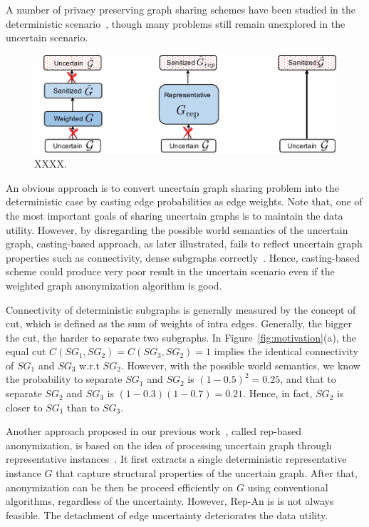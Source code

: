 A number of privacy preserving graph sharing schemes have been studied in the deterministic scenario~\cite{Liu_Towards_2008,Ying_Randomizing_2008,Wang2011,Liu_Privacy_2009,Nguyen_Anonymizing_2015,Sala_Sharing_2011,Xiao_Differentially_2014,lee2011}, though many problems still remain unexplored in the uncertain scenario.

\begin{figure}[!htb]
  \centering
  \includegraphics[width=0.9\linewidth]{ill/methods.pdf}
  \caption{XXXX.}
  \vspace{-14pt}
\end{figure}
An obvious approach is to convert uncertain graph sharing problem into the deterministic case by casting edge probabilities as edge weights. 
Note that, one of the most important goals of sharing uncertain graphs is to maintain the data utility. 
However, by disregarding the possible world semantics of the uncertain graph, casting-based approach, as later illustrated, fails to reflect uncertain graph properties such as connectivity, dense subgraphs correctly~\cite{Zhao_Detecting_2014,Hua_Probabilistic_2010}. 
Hence, casting-based scheme could produce very poor result in the uncertain scenario even if the weighted graph anonymization algorithm is good. 

{\small Connectivity of deterministic subgraphs is generally measured by the concept of cut, which is defined as the sum of weights of intra edges. Generally, the bigger the cut, the harder to separate two subgraphs. In Figure~\ref{fig:motivation}(a), the equal cut $C(SG_{1},SG_{2})=C(SG_{3},SG_{2})=1$ implies the identical connectivity of $SG_{1}$ and $SG_{3}$ w.r.t $SG_{2}$. However, with the possible world semantics, we know the probability to separate $SG_{1}$ and $SG_{2}$ is $(1-0.5)^{2}=0.25$, and that to separate $SG_{2}$ and $SG_{3}$ is $(1-0.3)(1-0.7)=0.21$. Hence, in fact, $SG_{2}$ is closer to $SG_{1}$ than to $SG_{3}$.} 

Another approach proposed in our previous work~\cite{Xiao:2018}, called rep-based anonymization, is based on the idea of processing uncertain graph through representative instances~\cite{Parchas_Gullo_Papadias_Bonchi_2014}.
It first extracts a single deterministic representative instance $G$ that capture structural properties of the uncertain graph.
After that, anonymization can be then be proceed efficiently on $G$ using conventional algorithms, regardless of the uncertainty.  
However, Rep-An is is not always feasible. 
The detachment of edge uncertainty deteriorates the data utility. 

